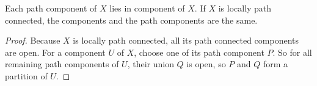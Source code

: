 \begin{theorem}
    Each path component of $X$ lies in component of $X$. If $X$ is locally path connected, the components and the path components are the same.    
\end{theorem}
\begin{proof}
    Because $X$ is locally path connected, all its path connected components are open. For a component $U$ of $X$, choose one of its path component $P$. So for all remaining path components of $U$, their union $Q$ is open, so $P$ and $Q$ form a partition of $U$.
\end{proof}
















